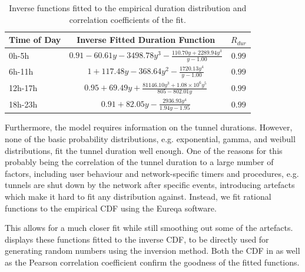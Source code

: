 \begin{table}
  \centering
  \caption{Inverse functions fitted to the empirical duration distribution and correlation coefficients of the fit.}
  \label{tab:cloud:virtualized_network_functions:measurement_data:evaluation:duration_fits}  
  \begin{tabular}{lcc}
  \toprule
  Time of Day & Inverse Fitted Duration Function & \(R_{dur}\)\\
  \midrule
  0h-5h & $0.91 - 60.61y - 3498.78y^3 - \frac{110.70y + 2289.94y^3}{y - 1.00}$ &  $0.99$ \\
  6h-11h & $1 + 117.48y - 368.64y^2 - \frac{1720.13y^4}{y - 1.00}$ & $0.99$ \\
  12h-17h & $0.95 + 69.49y + \frac{81146.10y^3 + 1.08\times10^6y^5}{805 - 802.01y}$ & $0.99$ \\
  18h-23h & $0.91 + 82.05y - \frac{2936.93y^4}{1.94y - 1.95}$ & $0.99$\\
  \bottomrule
  \end{tabular}
\end{table}

Furthermore, the model requires information on the tunnel durations.
However, none of the basic probability distributions, e.g. exponential, gamma, and weibull distributions, fit the tunnel duration well enough.
One of the reasons for this probably being the correlation of the tunnel duration to a large number of factors, including user behaviour and network-specific timers and procedures, e.g. tunnels are shut down by the network after specific events, introducing artefacts which make it hard to fit any distribution against.
Instead, we fit rational functions to the empirical \gls{CDF} using the Eureqa \cite{Schmidt2009} software.

This allows for a much closer fit while still smoothing out some of the artefacts.
 displays these functions fitted to the inverse \gls{CDF}, to be directly used for generating random numbers using the inversion method.
Both the \gls{CDF} in  as well as the Pearson correlation coefficient confirm the goodness of the fitted functions.
